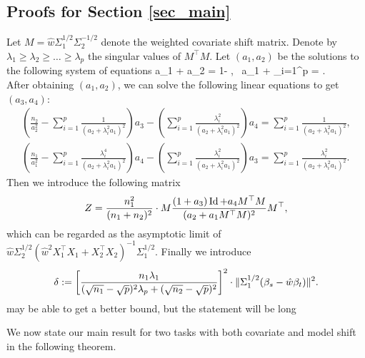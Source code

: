 \subsection{Proofs for Section \ref{sec_main}}\label{app_proof_main}



Let ${M} = \hat{w} \Sigma_1^{1/2}\Sigma_2^{-1/2}$ denote the weighted covariate shift matrix. Denote by ${\lambda}_1\ge {\lambda}_2 \ge \dots \ge {\lambda}_p$ the singular values of ${M}^{\top}{M}$. Let $(a_1, a_2)$ be the solutions to the following system of equations
	\be
		 a_1 + a_2 = 1- ,~ a_1 + \sum_{i=1}^p  = .\label{eq_a2} \\
		 \ee
		 After obtaining $(a_1,a_2)$, we can solve the following linear equations to get $(a_3,a_4)$:
\begin{gather}
		\left(\frac{n_2}{a_2^2}- \sum_{i=1}^p \frac{1}{ (a_2 + \lambda_i^2a_1)^2  }\right) a_3 -  \left(\sum_{i=1}^p \frac{  \lambda_i^2 }{ (  a_2 + \lambda_i^2a_1)^2  }\right)a_4
		= \sum_{i=1}^p \frac{1 }{ (  a_2 + \lambda_i^2a_1)^2  }, \label{eq_a3} \\
		\left(\frac{n_1}{a_1^2} -  \sum_{i=1}^p \frac{\lambda_i^4   }{  (a_2 + \lambda_i^2a_1)^2  }\right)a_4 -\left(\sum_{i=1}^p \frac{\lambda_i^2  }{  (a_2 + \lambda_i^2a_1)^2  }\right)a_3
		= \sum_{i=1}^p \frac{\lambda_i^2 }{  (a_2 + \lambda_i^2a_1)^2  }. \label{eq_a4}
	\end{gather}
Then we introduce the following matrix
$$Z = \frac{n_1^2}{(n_1 + n_2)^2}\cdot{M} \frac{(1 + a_3)\operatorname{Id} + a_4 {M}^{\top}{M}}{(a_2 + a_1 {M}^{\top}{M})^2} {M}^{\top},$$
which can be regarded as the asymptotic limit of $\hat w \Sigma_2^{1/2} (\hat{w}^2 X_1^{\top}X_1 + X_2^{\top}X_2)^{-1}\Sigma_1^{1/2}$. Finally we introduce
$$\delta:=\left[\frac{n_1 \lambda_1}{(\sqrt{n_1}-\sqrt{p})^2\lambda_p  +  (\sqrt{n_2}-\sqrt{p})^2}\right]^2\cdot \|\Sigma_1^{1/2}(\beta_s - \hat{w}\beta_t)\|^2.$$
{\cor may be able to get a better bound, but the statement will be long}

We now state our main result for two tasks with both covariate and model shift in the following theorem.

